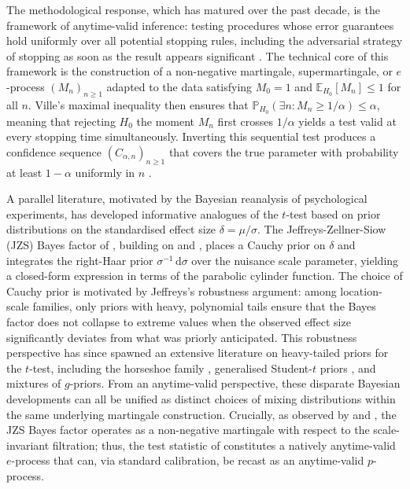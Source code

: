 \documentclass[numsec,webpdf,modern,medium,namedate]{oup-authoring-template}
\theoremstyle{thmstyleone}%
\theoremstyle{thmstyletwo}%
\theoremstyle{thmstylethree}%
\newcommand{\E}{\mathbb{E}}
\newcommand{\dd}{\,\mathrm{d}}
\newcommand{\1}{\mathbf{1}}
\begin{document}
The methodological response, which has matured over the past decade, is the framework of anytime-valid inference:  testing procedures whose error guarantees hold uniformly over all potential stopping rules, including the adversarial strategy of stopping as soon as the result appears significant \citep{Howard2021, grunwald2020safe, RamdasGrunwald2023}. The technical core of this framework is the construction of a non-negative martingale, supermartingale, or \(e\)-process \((M_n)_{n\geq 1}\) adapted to the data satisfying \(M_0=1\) and \(\E_{H_0}[M_n]\leq 1\) for all \(n\). Ville's maximal inequality \citep{ville1939etude} then ensures that \(\mathbb{P}_{H_0}(\exists n: M_n \geq 1/\alpha) \leq \alpha\), meaning that 
rejecting $H_0$ the moment $M_n$ first crosses $1/\alpha$ yields a test valid at every stopping time simultaneously. Inverting this sequential test produces a confidence sequence $(C_{\alpha,n})_{n \geq 1}$ that covers the true 
parameter with probability at least $1-\alpha$ uniformly in $n$ \citep{Darling1967, Robbins1970, Lai1976}.


A parallel literature, motivated by the Bayesian reanalysis of psychological experiments, has developed informative analogues of the \(t\)-test based on prior distributions on the standardised effect size
\(\delta=\mu/\sigma\). The Jeffreys-Zellner-Siow (JZS) Bayes factor of \cite{Rouder2009}, building on \cite{jeffreys1998theory} and \cite{zellner1980posterior}, places a Cauchy prior on \(\delta\) and integrates the right-Haar prior \(\sigma^{-1}\dd\sigma\) over the nuisance scale parameter, yielding a closed-form expression in terms of the parabolic cylinder function. The choice of Cauchy prior is motivated by Jeffreys's robustness argument: among location-scale families, only priors with heavy, polynomial tails ensure that the Bayes factor does not collapse to extreme values when the observed effect size significantly deviates from what was priorly anticipated. This robustness perspective has since spawned an extensive literature on heavy-tailed priors for the \(t\)-test, including the horseshoe family
\cite{Carvalho2010}, generalised Student-\(t\) priors \cite{gronau2020informed}, and mixtures of \(g\)-priors. From an anytime-valid perspective, these disparate Bayesian developments can all be unified as distinct choices of mixing distributions within the same underlying martingale construction. Crucially, as observed by \cite{PerezOrtiz2024} and \cite{Wang2025}, the JZS Bayes factor operates as a non-negative martingale with respect to the scale-invariant filtration; thus, the test statistic of \cite{Rouder2009} constitutes a natively anytime-valid $e$-process that can, via standard calibration, be recast as an anytime-valid $p$-process.
\end{document}
